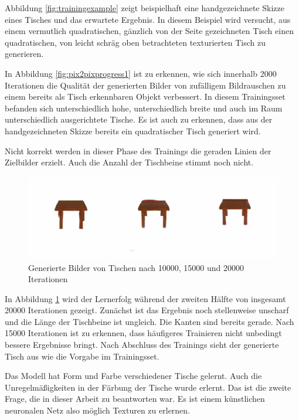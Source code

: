Abbildung \ref{fig:trainingexample} zeigt beispielhaft eine handgezeichnete Skizze eines Tisches und das erwartete Ergebnis. In diesem Beispiel wird versucht, aus einem vermutlich quadratischen, gänzlich von der Seite gezeichneten Tisch einen quadratischen, von leicht schräg oben betrachteten texturierten Tisch zu generieren.

In Abbildung \ref{fig:pix2pixprogress1} ist zu erkennen, wie sich innerhalb 2000 Iterationen die Qualität der generierten Bilder von zufälligem Bildrauschen zu einem bereits als Tisch erkennbaren Objekt verbessert. In diesem Trainingsset befanden sich unterschiedlich hohe, unterschiedlich breite und auch im Raum unterschiedlich ausgerichtete Tische. Es ist auch zu erkennen, dass aus der handgezeichneten Skizze bereits ein quadratischer Tisch generiert wird.

Nicht korrekt werden in dieser Phase des Trainings die geraden Linien der Zielbilder erzielt. Auch die Anzahl der Tischbeine stimmt noch nicht.

\begin{figure}[h]
	\centering
	\includegraphics[width=1.0\textwidth]{bilder/pix2pix_progress/progress_tables2.png}
	\caption[Lernerfolg am Beispiel von Tischen]{Generierte Bilder von Tischen nach 10000, 15000 und 20000 Iterationen}
	\label{fig:pix2pixprogress2}
\end{figure}

In Abbildung \ref{fig:pix2pixprogress2} wird der Lernerfolg während der zweiten Hälfte von insgesamt 20000 Iterationen gezeigt. Zunächst ist das Ergebnis noch stellenweise unscharf und die Länge der Tischbeine ist ungleich. Die Kanten sind bereits gerade. Nach 15000 Iterationen ist zu erkennen, dass häufigeres Trainieren nicht unbedingt bessere Ergebnisse bringt. Nach Abschluss des Trainings sieht der generierte Tisch aus wie die Vorgabe im Trainingsset.

Das Modell hat Form und Farbe verschiedener Tische gelernt. Auch die Unregelmäßigkeiten in der Färbung der Tische wurde erlernt. Das ist die zweite Frage, die in dieser Arbeit zu beantworten war. Es ist einem künstlichen neuronalen Netz also möglich Texturen zu erlernen.

